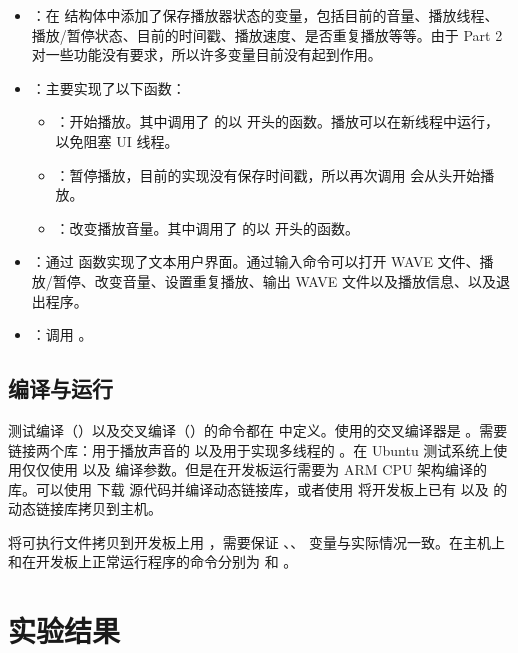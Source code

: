 \begin{itemize}
    \item {}：在  结构体中添加了保存播放器状态的变量，包括目前的音量、播放线程、播放/暂停状态、目前的时间戳、播放速度、是否重复播放等等。由于 Part 2 对一些功能没有要求，所以许多变量目前没有起到作用。
    \item {}：主要实现了以下函数：
    \begin{itemize}
        \item {}：开始播放。其中调用了  的以  开头的函数。播放可以在新线程中运行，以免阻塞 UI 线程。
        \item {}：暂停播放，目前的实现没有保存时间戳，所以再次调用  会从头开始播放。
        \item {}：改变播放音量。其中调用了  的以  开头的函数。
    \end{itemize}
    \item {}：通过  函数实现了文本用户界面。通过输入命令可以打开 WAVE 文件、播放/暂停、改变音量、设置重复播放、输出 WAVE 文件以及播放信息、以及退出程序。
    \item {}：调用 。
\end{itemize}

\subsection{编译与运行}\label{sec:compile}

测试编译（）以及交叉编译（）的命令都在  中定义。使用的交叉编译器是 。需要链接两个库：用于播放声音的  以及用于实现多线程的 。在 Ubuntu 测试系统上使用仅仅使用  以及  编译参数。但是在开发板运行需要为 ARM CPU 架构编译的库。可以使用  下载  源代码并编译动态链接库，或者使用  将开发板上已有  以及  的动态链接库拷贝到主机。

将可执行文件拷贝到开发板上用 ，需要保证 、、 变量与实际情况一致。在主机上和在开发板上正常运行程序的命令分别为  和 。

\section{实验结果}

